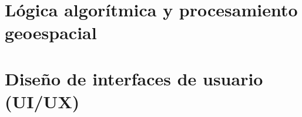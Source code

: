 \section{Lógica algorítmica y procesamiento geoespacial}
\label{sec:logica_algoritmica}


\section{Diseño de interfaces de usuario (UI/UX)}
\label{sec:diseno_interfaces}


